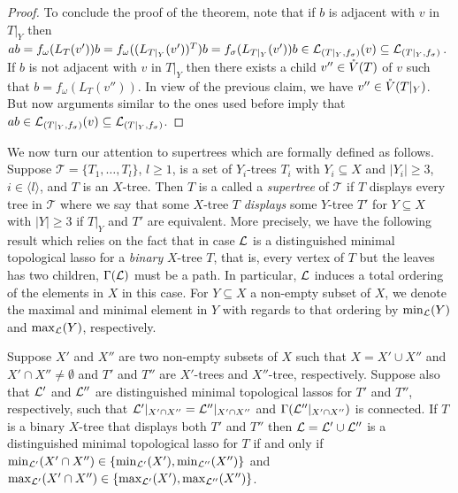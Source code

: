 \begin{proof}
  To conclude the proof of the theorem, note that if $b$ is adjacent with $v$
  in $T|_Y$ then $ab= f_{\omega}(L_T(v'))b=f_{\omega}((L_{T|_Y}(v'))^T)b=
  f_{\sigma}(L_{T|_Y}(v'))b\in{\mathcal L}_{(T|_Y,f_{\sigma})}(v) \subseteq
  {\mathcal L}_{(T|_Y,f_{\sigma})}$.  If $b$ is not adjacent with $v$ in $T|_Y$ then
  there exists a child $v''\in \mathring{V}(T)$ of $v$ such that
  $b=f_{\omega}(L_T(v''))$.  In view of the previous claim, we have $v''\in
  \mathring{V}(T|_Y)$.  But now arguments similar to the ones used before imply that
  $ab\in {\mathcal L}_{(T|_Y,f_{\sigma})}(v)\subseteq {\mathcal L}_{(T|_Y,f_{\sigma})}$.
\end{proof}

We now turn our attention to supertrees which are formally defined as
follows. Suppose $\mathcal T=\{T_1,\ldots, T_l\}$, $l\geq 1$, is a set of
$Y_i$-trees $T_i$ with $Y_i\subseteq X$ and $|Y_i|\geq 3$, $i\in\langle
l\rangle$, and $T$ is an $X$-tree. Then $T$ is a called a {\em supertree} of
$\mathcal T $ if $T$ displays every tree in $\mathcal T$ where we say that
some $X$-tree $T$ {\em displays} some $Y$-tree $T'$ for $Y\subseteq X$ with
$|Y|\geq 3$ if $T|_Y$ and $T'$ are equivalent. More precisely, we have the
following result which relies on the fact that in case ${\mathcal L}$ is a
distinguished minimal topological lasso for a {\em binary} $X$-tree $T$, that
is, every vertex of $T$ but the leaves has two children, $\Gamma({\mathcal L})$ must be
a path. In particular, ${\mathcal L}$ induces a total ordering of the elements in $X$
in this case.  For $Y\subseteq X$ a non-empty subset of $X$, we denote the
maximal and minimal element in $Y$ with regards to that ordering by
$\min_{{\mathcal L}}(Y)$ and $\max_{{\mathcal L}}(Y)$, respectively.

\begin{cor}
  \label{cor:supertree}
  Suppose $X'$ and $X''$ are two non-empty subsets of $X$ such that $X=X'\cup
  X''$ and $X'\cap X''\not=\emptyset$ and $T'$ and $T''$ are $X'$-trees and
  $X''$-tree, respectively. Suppose also that ${\mathcal L}'$ and ${\mathcal L}''$ are
  distinguished minimal topological lassos for $T'$ and $T''$, respectively,
  such that ${\mathcal L}'|_{X'\cap X''} ={\mathcal L}''|_{X'\cap X''}$ and
  $\Gamma({\mathcal L}''|_{X'\cap X''})$ is connected.  If $T$ is a binary $X$-tree
  that displays both $T'$ and $T''$ then ${\mathcal L}={\mathcal L}'\cup{\mathcal L}''$ is a
  distinguished minimal topological lasso for $T$ if and only if
  $\min_{{\mathcal L}'}(X'\cap X'')\in \{\min_{{\mathcal L}'}(X'), \min_{{\mathcal L}''}(X'')\}$ and
  $\max_{{\mathcal L}'}(X'\cap X'')\in \{\max_{{\mathcal L}'}(X'), \max_{{\mathcal L}''}(X'')\}$.
\end{cor}

